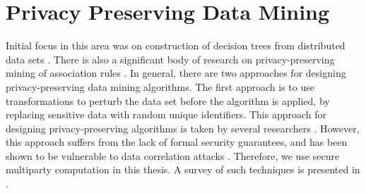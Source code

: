\section{Privacy Preserving Data Mining }

Initial focus in this area was on construction of decision trees from
distributed data sets \cite{Agrawal-Srikant,Lindell-Pinkas}. There
is also a significant body of research on privacy-preserving mining
of association rules \cite{Gehrke:2002,RizviHarista,VaidyaClifton:2002}.
In general, there are two approaches for designing privacy-preserving
data mining algorithms. The first approach is to use transformations
to perturb the data set before the algorithm is applied, by replacing
sensitive data with random unique identifiers. This approach for designing
privacy-preserving algorithms is taken by several researchers \cite{Klusch,MeruguGhosh,Oliveira}.
However, this approach suffers from the lack of formal security guarantees,
and has been shown to be vulnerable to data correlation attacks \cite{Malin04}.
Therefore, we use secure multiparty computation in this thesis.
A survey of such techniques is presented
in \cite{PinkasCryptoPPDM02}. 

%
\begin{comment}
 


\end{comment}
{} 
